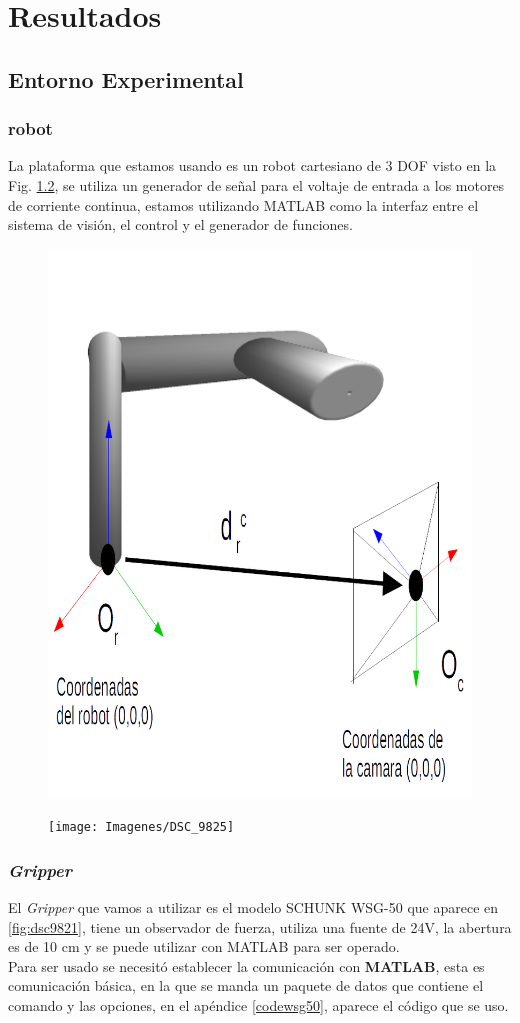 \chapter{Resultados}

\section{Entorno Experimental}



\subsection{robot}
La plataforma que estamos usando es un robot cartesiano de 3 DOF visto en la Fig. \ref{fig:dsc9825}, se utiliza un generador de señal para el voltaje de entrada a los motores de corriente continua, estamos utilizando MATLAB como la interfaz entre el sistema de visión, el control y el generador de funciones.

\begin{figure}
	\centering
	\includegraphics[width=0.5\linewidth]{visio/visio3/coordenadasrobcam2}
	\caption{}
	\label{fig:coordenadasrobcam}
\end{figure}


\begin{figure}
	\centering
	\texttt{[image: Imagenes/DSC\_9825]}
	\caption{}
	\label{fig:dsc9825}
\end{figure}



\subsection{\textit{Gripper}}
El \textit{Gripper} que vamos a utilizar es el modelo SCHUNK WSG-50 que aparece en \cref{fig:dsc9821}, tiene un observador de fuerza, utiliza una fuente de 24V, la abertura es de 10 cm y se puede utilizar con MATLAB para ser operado. \\
Para ser usado se necesitó establecer la comunicación con \textbf{MATLAB}, esta es comunicación básica, en la que se manda un paquete de datos que contiene el comando y las opciones, en el apéndice \ref{codewsg50}, aparece el código que se uso.

